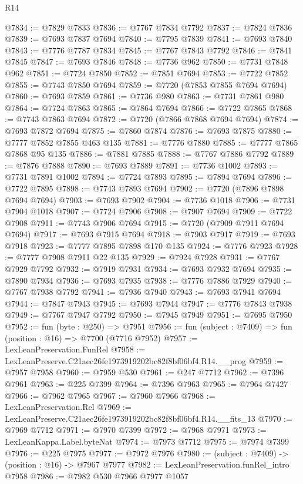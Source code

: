 \begin{lexlean}{R14}
\begin{coremodule}
@7834 := @7829 @7833
@7836 := @7767 @7834 @7792
@7837 := @7824 @7836
@7839 := @7693 @7837 @7694
@7840 := @7795 @7839
@7841 := @7693 @7840
@7843 := @7776 @7787 @7834
@7845 := @7767 @7843 @7792
@7846 := @7841 @7845
@7847 := @7693 @7846
@7848 := @7736 @962
@7850 := @7731 @7848 @962
@7851 := @7724 @7850
@7852 := @7851 @7694
@7853 := @7722 @7852
@7855 := @7743 @7850 @7694
@7859 := @7720 (@7853 @7855 @7694 @7694)
@7860 := @7693 @7859
@7861 := @7736 @980
@7863 := @7731 @7861 @980
@7864 := @7724 @7863
@7865 := @7864 @7694
@7866 := @7722 @7865
@7868 := @7743 @7863 @7694
@7872 := @7720 (@7866 @7868 @7694 @7694)
@7874 := @7693 @7872 @7694
@7875 := @7860 @7874
@7876 := @7693 @7875
@7880 := @7777 @7852 @7855 @463 @135
@7881 := @7776 @7880
@7885 := @7777 @7865 @7868 @95 @135
@7886 := @7881 @7885
@7888 := @7767 @7886 @7792
@7889 := @7876 @7888
@7890 := @7693 @7889
@7891 := @7736 @1002
@7893 := @7731 @7891 @1002
@7894 := @7724 @7893
@7895 := @7894 @7694
@7896 := @7722 @7895
@7898 := @7743 @7893 @7694
@7902 := @7720 (@7896 @7898 @7694 @7694)
@7903 := @7693 @7902
@7904 := @7736 @1018
@7906 := @7731 @7904 @1018
@7907 := @7724 @7906
@7908 := @7907 @7694
@7909 := @7722 @7908
@7911 := @7743 @7906 @7694
@7915 := @7720 (@7909 @7911 @7694 @7694)
@7917 := @7693 @7915 @7694
@7918 := @7903 @7917
@7919 := @7693 @7918
@7923 := @7777 @7895 @7898 @170 @135
@7924 := @7776 @7923
@7928 := @7777 @7908 @7911 @22 @135
@7929 := @7924 @7928
@7931 := @7767 @7929 @7792
@7932 := @7919 @7931
@7934 := @7693 @7932 @7694
@7935 := @7890 @7934
@7936 := @7693 @7935
@7938 := @7776 @7886 @7929
@7940 := @7767 @7938 @7792
@7941 := @7936 @7940
@7943 := @7693 @7941 @7694
@7944 := @7847 @7943
@7945 := @7693 @7944
@7947 := @7776 @7843 @7938
@7949 := @7767 @7947 @7792
@7950 := @7945 @7949
@7951 := @7695 @7950
@7952 := fun (byte : @250) => @7951
@7956 := fun (subject : @7409) => fun (position : @16) => @7700 (@7716 @7952)
@7957 := LexLeanPreservation.FunRel
@7958 := LexLeanPreserve.C21aec26fe1973919202bc82f8bf06bf4.R14.__prog
@7959 := @7957 @7958
@7960 := @7959 @530
@7961 := @247 @7712
@7962 := @7396 @7961
@7963 := @225 @7399
@7964 := @7396 @7963
@7965 := @7964 @7427
@7966 := @7962 @7965
@7967 := @7960 @7966
@7968 := LexLeanPreservation.Rel
@7969 := LexLeanPreserve.C21aec26fe1973919202bc82f8bf06bf4.R14.__fits_13
@7970 := @7969 @7712
@7971 := @7970 @7399
@7972 := @7968 @7971
@7973 := LexLeanKappa.Label.byteNat
@7974 := @7973 @7712
@7975 := @7974 @7399
@7976 := @225 @7975
@7977 := @7972 @7976
@7980 := (subject : @7409) -> (position : @16) -> @7967 @7977
@7982 := LexLeanPreservation.funRel_intro @7958
@7986 := @7982 @530 @7966 @7977 @1057

\end{coremodule}
\end{lexlean}

